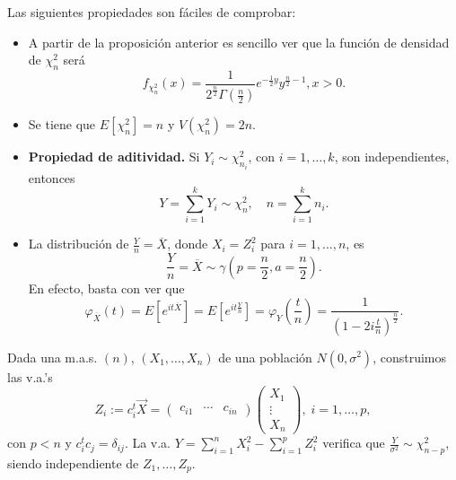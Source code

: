 \begin{observation} Las siguientes propiedades son fáciles de comprobar:
	\begin{itemize}
	\item A partir de la proposición anterior es sencillo ver que la función de densidad de $\displaystyle \chi_{n}^{2} $ será
\[f_{\chi_{n}^{2}}\left(x\right)=\frac{1}{2^{\frac{n}{2}}\Gamma\left(\frac{n}{2}\right)}e^{-\frac{1}{2}y}y^{\frac{n}{2}-1}, x > 0 .\]
\item Se tiene que $\displaystyle E\left[\chi_{n}^{2}\right] =n $ y $\displaystyle V\left(\chi_{n}^{2}\right)=2n $.
\item \textbf{Propiedad de aditividad.} Si $\displaystyle Y_{i} \sim \chi_{n_{i}}^{2} $, con $\displaystyle i = 1, \ldots, k $, son independientes, entonces
	\[Y = \sum^{k}_{i = 1}Y_{i} \sim \chi_{n}^{2}, \quad n = \sum^{k}_{i=1}n_{i} .\]
\item La distribución de $\displaystyle \frac{Y}{n}=\overline{X} $, donde $\displaystyle X_{i}=Z_{i}^{2} $ para $\displaystyle i = 1, \ldots, n $, es
	\[\frac{Y}{n}=\overline{X}\sim \gamma\left(p = \frac{n}{2}, a = \frac{n}{2}\right) .\]
	En efecto, basta con ver que
	\[\varphi_{\overline{X}}\left(t\right)=E\left[e^{it\overline{X}}\right] =E\left[e^{it\frac{Y}{n}}\right] =\varphi_{Y}\left(\frac{t}{n}\right)=\frac{1}{\left(1-2i\frac{t}{n}\right)^{\frac{n}{2}}} .\]
	\end{itemize} 
\end{observation}
\begin{lema}
Dada una m.a.s. $\displaystyle \left(n\right) $, $\displaystyle \left(X_{1}, \ldots, X_{n}\right) $ de una población $\displaystyle N\left(0, \sigma^{2}\right) $, construimos las v.a.'s
\[Z_{i}:=c_{i}^{t}\vec{X}=\begin{pmatrix} c_{i1} & \cdots & c_{in} \end{pmatrix}\begin{pmatrix} X_{1} \\ \vdots \\ X_{n} \end{pmatrix}, \; i = 1, \ldots, p ,\]
con $\displaystyle p < n $ y $\displaystyle c_{i}^{t}c_{j}=\delta_{ij} $. La v.a. $\displaystyle Y = \sum^{n}_{i = 1}X_{i}^{2}-\sum^{p}_{i = 1}Z_{i}^{2} $ verifica que $\displaystyle \frac{Y}{\sigma^{2}}\sim \chi^{2}_{n-p} $, siendo independiente de $\displaystyle Z_{1}, \ldots, Z_{p} $. 
\end{lema}
